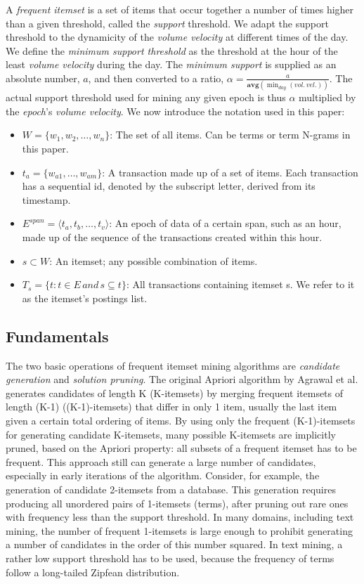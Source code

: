 \documentclass[letterpaper,12pt,titlepage,oneside,final]{book}
\begin{document}
A \emph{frequent itemset} is a set of items that occur together a number of
times higher than a given threshold, called the \emph{support} threshold.
We adapt the support threshold to the dynamicity of the \emph{volume velocity} at
different times of the day.
We define the \emph{minimum support threshold} as the threshold at the hour
of the least \emph{volume velocity} during the day.
The \emph{minimum support} is supplied as an absolute number, $a$, and then
converted to a ratio, $\alpha = \frac{a}{\textbf{avg}(\min_{day}{(vol.\, vel.)})}$.
The actual support threshold used for mining any given epoch is thus
$\alpha$ multiplied by the \emph{epoch}'s \emph{volume velocity}. 
We now introduce the notation used in this paper:
\begin{itemize}
\item $W = \{w_1,w_2,\ldots, w_n\}$: The set of all items. Can be terms or term N-grams in this paper.
\item $t_a = \{w_{a1},\ldots, w_{am}\}$: A transaction made up of a set of items. Each transaction has a sequential id, denoted by the subscript letter, derived from its timestamp.
\item $E^{span} = \langle t_a, t_b, \ldots, t_v\rangle$: An epoch of data of a certain span, such as an hour, made up of the sequence of the transactions created within this hour.
\item $s \subset W$: An itemset; any possible combination of items. 
\item $T_s = \{t: t \in E \, and \, s \subseteq t\}$: All transactions containing itemset s. We refer to it as the itemset's postings list.
\end{itemize}

\subsection{Fundamentals}

The two basic operations of frequent itemset mining algorithms are
\emph{candidate generation} and \emph{solution pruning}.
The original Apriori algorithm by Agrawal et al. \cite{agrawal1994fast}
generates candidates of length K (K-itemsets) by merging frequent itemsets of
length (K-1) ((K-1)-itemsets) that differ in only 1 item, usually the last
item given a certain total ordering of items.
By using only the frequent  (K-1)-itemsets for generating candidate K-itemsets,
many possible K-itemsets are implicitly pruned, based on the Apriori property:
all subsets of a frequent itemset has to be frequent.
This approach still can generate a large number of candidates, especially
in early iterations of the algorithm.
Consider, for example, the generation of candidate 2-itemsets from a database.
This generation requires producing all unordered pairs of 1-itemsets (terms),
after pruning out rare ones with frequency less than the support threshold.
In many domains, including text mining, the number of frequent 1-itemsets is
large enough to prohibit generating a number of candidates in the order of this
number squared.
In text mining, a rather low support threshold has to be used, because the
frequency of terms follow a long-tailed Zipfean distribution.
\end{document}
